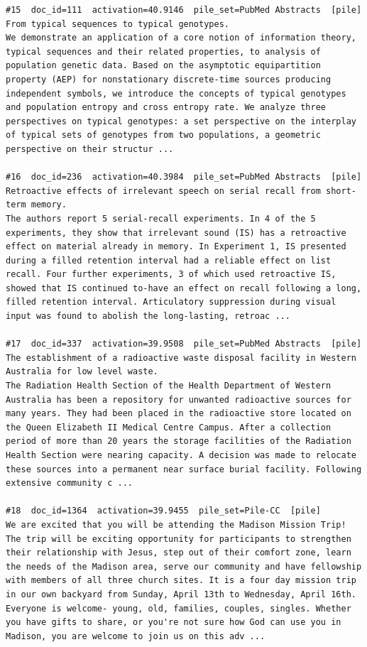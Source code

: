 \begin{verbatim}
#15  doc_id=111  activation=40.9146  pile_set=PubMed Abstracts  [pile]
From typical sequences to typical genotypes.
We demonstrate an application of a core notion of information theory, typical sequences and their related properties, to analysis of population genetic data. Based on the asymptotic equipartition property (AEP) for nonstationary discrete-time sources producing independent symbols, we introduce the concepts of typical genotypes and population entropy and cross entropy rate. We analyze three perspectives on typical genotypes: a set perspective on the interplay of typical sets of genotypes from two populations, a geometric perspective on their structur ...

#16  doc_id=236  activation=40.3984  pile_set=PubMed Abstracts  [pile]
Retroactive effects of irrelevant speech on serial recall from short-term memory.
The authors report 5 serial-recall experiments. In 4 of the 5 experiments, they show that irrelevant sound (IS) has a retroactive effect on material already in memory. In Experiment 1, IS presented during a filled retention interval had a reliable effect on list recall. Four further experiments, 3 of which used retroactive IS, showed that IS continued to-have an effect on recall following a long, filled retention interval. Articulatory suppression during visual input was found to abolish the long-lasting, retroac ...

#17  doc_id=337  activation=39.9508  pile_set=PubMed Abstracts  [pile]
The establishment of a radioactive waste disposal facility in Western Australia for low level waste.
The Radiation Health Section of the Health Department of Western Australia has been a repository for unwanted radioactive sources for many years. They had been placed in the radioactive store located on the Queen Elizabeth II Medical Centre Campus. After a collection period of more than 20 years the storage facilities of the Radiation Health Section were nearing capacity. A decision was made to relocate these sources into a permanent near surface burial facility. Following extensive community c ...

#18  doc_id=1364  activation=39.9455  pile_set=Pile-CC  [pile]
We are excited that you will be attending the Madison Mission Trip! The trip will be exciting opportunity for participants to strengthen their relationship with Jesus, step out of their comfort zone, learn the needs of the Madison area, serve our community and have fellowship with members of all three church sites. It is a four day mission trip in our own backyard from Sunday, April 13th to Wednesday, April 16th. Everyone is welcome- young, old, families, couples, singles. Whether you have gifts to share, or you're not sure how God can use you in Madison, you are welcome to join us on this adv ...


\end{verbatim}
